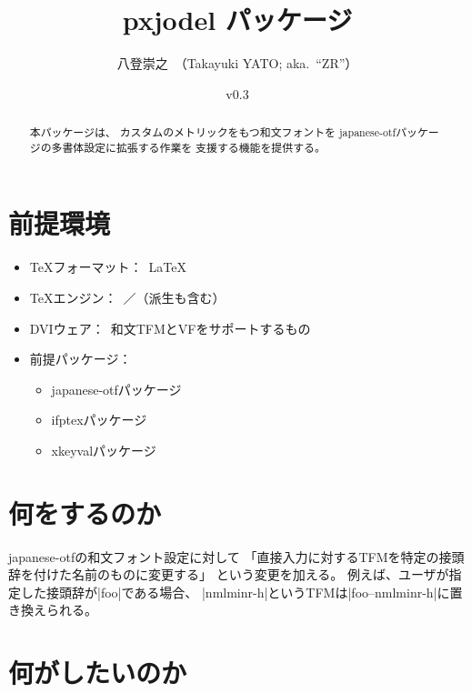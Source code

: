 \documentclass[uplatex,dvipdfmx,a4paper]{jsarticle}
\newcommand{\PkgVersion}{0.3}
\newcommand{\PkgDate}{2020/05/04}
\newcommand{\Pkg}[1]{\textsf{#1}}
\newcommand{\Means}{：\ }
\begin{document}
\title{\Pkg{pxjodel} パッケージ}
\author{八登崇之\ （Takayuki YATO; aka.~``ZR''）}
\date{v\PkgVersion\quad[\PkgDate]}
\maketitle

\begin{abstract}
本パッケージは、
カスタムのメトリックをもつ和文フォントを
\Pkg{japanese-otf}パッケージの多書体設定に拡張する作業を
支援する機能を提供する。
\end{abstract}


\section{前提環境}
\label{sec:Requirement}

\begin{itemize}
\item {\TeX}フォーマット\Means {\LaTeX}
\item {\TeX}エンジン\Means {\pTeX}／{\upTeX}（派生も含む）
\item DVIウェア\Means 和文TFMとVFをサポートするもの
\item 前提パッケージ\Means
  \begin{itemize}
  \item \Pkg{japanese-otf}パッケージ
  \item \Pkg{ifptex}パッケージ
  \item \Pkg{xkeyval}パッケージ
  \end{itemize}
\end{itemize}

\section{何をするのか}
\label{sec:Basic}

\Pkg{japanese-otf}の和文フォント設定に対して
「直接入力に対するTFMを特定の接頭辞を付けた名前のものに変更する」
という変更を加える。
例えば、ユーザが指定した接頭辞が|foo|である場合、
|nmlminr-h|というTFMは|foo--nmlminr-h|に置き換えられる。

\section{何がしたいのか}
\label{sec:Objective}
\end{document}
